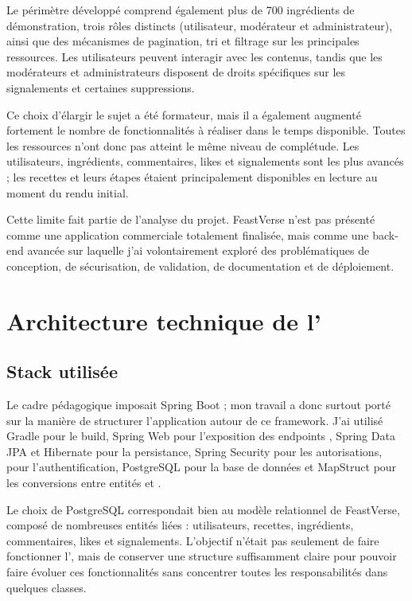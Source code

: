 Le périmètre développé comprend également plus de 700 ingrédients de démonstration, trois rôles distincts (utilisateur, modérateur et administrateur), ainsi que des mécanismes de pagination, tri et filtrage sur les principales ressources. Les utilisateurs peuvent interagir avec les contenus, tandis que les modérateurs et administrateurs disposent de droits spécifiques sur les signalements et certaines suppressions.

Ce choix d'élargir le sujet a été formateur, mais il a également augmenté fortement le nombre de fonctionnalités à réaliser dans le temps disponible. Toutes les ressources n'ont donc pas atteint le même niveau de complétude. Les utilisateurs, ingrédients, commentaires, likes et signalements sont les plus avancés ; les recettes et leurs étapes étaient principalement disponibles en lecture au moment du rendu initial.

Cette limite fait partie de l'analyse du projet. FeastVerse n'est pas présenté comme une application commerciale totalement finalisée, mais comme une  back-end avancée sur laquelle j'ai volontairement exploré des problématiques de conception, de sécurisation, de validation, de documentation et de déploiement.

\section{Architecture technique de l'}

\subsection{Stack utilisée}

Le cadre pédagogique imposait Spring Boot ; mon travail a donc surtout porté sur la manière de structurer l'application autour de ce framework. J'ai utilisé Gradle pour le build, Spring Web pour l'exposition des endpoints , Spring Data JPA et Hibernate pour la persistance, Spring Security pour les autorisations,  pour l'authentification, PostgreSQL pour la base de données et MapStruct pour les conversions entre entités et .

Le choix de PostgreSQL correspondait bien au modèle relationnel de FeastVerse, composé de nombreuses entités liées : utilisateurs, recettes, ingrédients, commentaires, likes et signalements. L'objectif n'était pas seulement de faire fonctionner l', mais de conserver une structure suffisamment claire pour pouvoir faire évoluer ces fonctionnalités sans concentrer toutes les responsabilités dans quelques classes.

